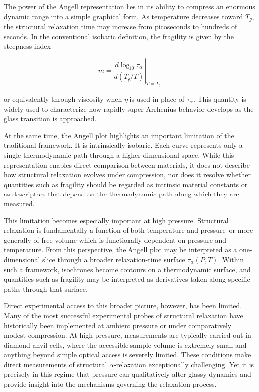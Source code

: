 The power of the Angell representation lies in its ability to compress an enormous dynamic range into a simple graphical form. As temperature decreases toward $T_g$, the structural relaxation time may increase from picoseconds to hundreds of seconds. In the conventional isobaric definition, the fragility is given by the steepness index

\begin{equation}
	m=\left.\frac{d\log_{10}\tau_\alpha}{d(T_g/T)}\right|_{T=T_g}
	\label{eq:fragility}
\end{equation}

or equivalently through viscosity when $\eta$ is used in place of $\tau_\alpha$. This quantity is widely used to characterize how rapidly super-Arrhenius behavior develops as the glass transition is approached.

At the same time, the Angell plot highlights an important limitation of the traditional framework. It is intrinsically isobaric. Each curve represents only a single thermodynamic path through a higher-dimensional space. While this representation enables direct comparison between materials, it does not describe how structural relaxation evolves under compression, nor does it resolve whether quantities such as fragility should be regarded as intrinsic material constants or as descriptors that depend on the thermodynamic path along which they are measured.

This limitation becomes especially important at high pressure. Structural relaxation is fundamentally a function of both temperature and pressure--or more generally of free volume which is functionally dependent on pressure and temperature. From this perspective, the Angell plot may be interpreted as a one-dimensional slice through a broader relaxation-time surface $\tau_\alpha(P,T)$. Within such a framework, isochrones become contours on a thermodynamic surface, and quantities such as fragility may be interpreted as derivatives taken along specific paths through that surface.

Direct experimental access to this broader picture, however, has been limited. Many of the most successful experimental probes of structural relaxation have historically been implemented at ambient pressure or under comparatively modest compression. At high pressure, measurements are typically carried out in diamond anvil cells, where the accessible sample volume is extremely small and anything beyond simple optical access is severely limited. These conditions make direct measurements of structural $\alpha$-relaxation exceptionally challenging. Yet it is precisely in this regime that pressure can qualitatively alter glassy dynamics and provide insight into the mechanisms governing the relaxation process.

